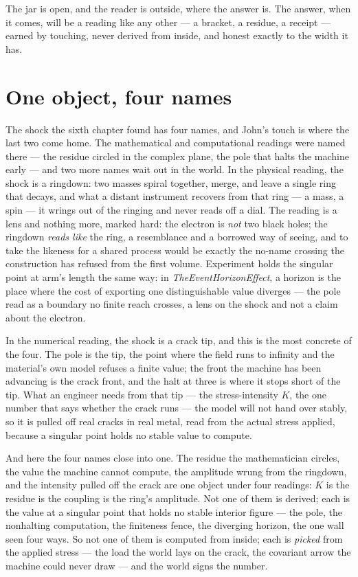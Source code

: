 The jar is open, and the reader is outside, where the answer is.
The answer, when it comes, will be a reading like any other --- a bracket, a residue, a receipt --- earned by touching,
never derived from inside, and honest exactly to the width it has.

\section{One object, four names}

The shock the sixth chapter found has four names, and John's touch is where the last two come home.
The mathematical and computational readings were named there --- the residue circled in the complex plane, the pole that
halts the machine early --- and two more names wait out in the world.
In the physical reading, the shock is a ringdown: two masses spiral together, merge, and leave a single ring that decays,
and what a distant instrument recovers from that ring --- a mass, a spin --- it wrings out of the ringing and never reads
off a dial.
The reading is a lens and nothing more, marked hard: the electron is \emph{not} two black holes; the ringdown
\emph{reads like} the ring, a resemblance and a borrowed way of seeing, and to take the likeness for a shared process
would be exactly the no-name crossing the construction has refused from the first volume.
Experiment holds the singular point at arm's length the same way: in \emph{TheEventHorizonEffect}, a horizon is the place
where the cost of exporting one distinguishable value diverges --- the pole read as a boundary no finite reach crosses,
a lens on the shock and not a claim about the electron.

In the numerical reading, the shock is a crack tip, and this is the most concrete of the four.
The pole is the tip, the point where the field runs to infinity and the material's own model refuses a finite value; the
front the machine has been advancing is the crack front, and the halt at three is where it stops short of the tip.
What an engineer needs from that tip --- the stress-intensity $K$, the one number that says whether the crack runs --- the
model will not hand over stably, so it is pulled off real cracks in real metal, read from the actual stress applied,
because a singular point holds no stable value to compute.

And here the four names close into one.
The residue the mathematician circles, the value the machine cannot compute, the amplitude wrung from the ringdown, and
the intensity pulled off the crack are one object under four readings: $K$ is the residue is the coupling is the ring's
amplitude.
Not one of them is derived; each is the value at a singular point that holds no stable interior figure --- the pole, the
nonhalting computation, the finiteness fence, the diverging horizon, the one wall seen four ways.
So not one of them is computed from inside; each is \emph{picked} from the applied stress --- the load the world lays on
the crack, the covariant arrow the machine could never draw --- and the world signs the number.

